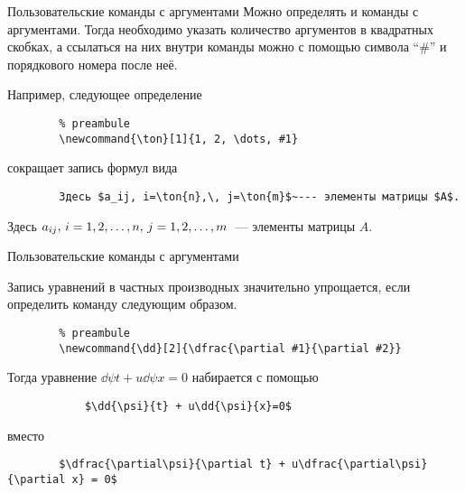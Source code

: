 \begin{frame}[fragile]{Пользовательские команды с аргументами}
	Можно определять и команды с аргументами. Тогда необходимо указать количество аргументов в квадратных скобках, а ссылаться на них внутри команды можно с помощью символа ``\#'' и порядкового номера после неё.
	
	Например, следующее определение 
	\begin{verbatim}
		% preambule
		\newcommand{\ton}[1]{1, 2, \dots, #1}
	\end{verbatim}
	сокращает запись формул вида
	\begin{verbatim}
		Здесь $a_ij, i=\ton{n},\, j=\ton{m}$~--- элементы матрицы $A$.
	\end{verbatim}
	Здесь $a_{ij},\, i=\ton{n},\, j=\ton{m}$~--- элементы матрицы $A$.	
\end{frame}

\begin{frame}[fragile]{Пользовательские команды с аргументами}

	Запись уравнений в частных производных значительно упрощается, если определить команду \texttt{\dd} следующим образом.
	\begin{verbatim}
		% preambule
		\newcommand{\dd}[2]{\dfrac{\partial #1}{\partial #2}}
	\end{verbatim}
	
	Тогда уравнение $\dd{\psi}{t} + u\dd{\psi}{x}=0$ набирается с помощью 
	
	\begin{verbatim}
			$\dd{\psi}{t} + u\dd{\psi}{x}=0$
	\end{verbatim}
	
	вместо 
	
	\begin{verbatim}
		$\dfrac{\partial\psi}{\partial t} + u\dfrac{\partial\psi}{\partial x} = 0$
	\end{verbatim}
\end{frame}

